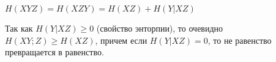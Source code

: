 \documentclass[../main.tex]{subfiles}
\begin{document}
$H(XYZ) = H(XZY) = H(XZ) + H(Y|XZ)$

Так как $H(Y|XZ) \geq 0$ (свойство энторпии), то очевидно $H(XY;Z) \geq H(XZ)$, причем если \newline $H(Y|XZ) = 0$, то не равенство превращается в равенство. 
\end{document}
